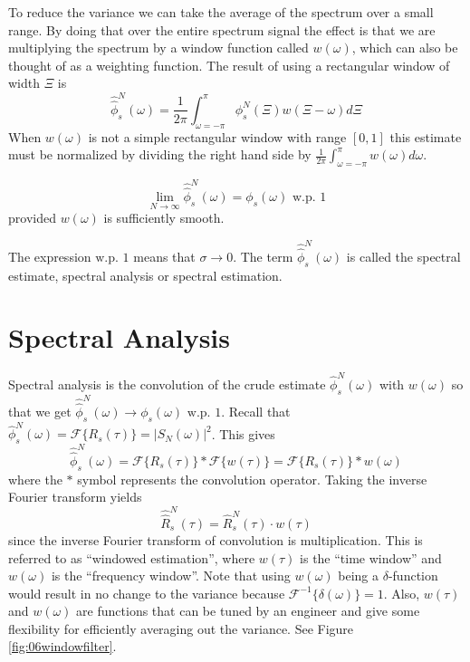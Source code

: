 \documentclass[lecture,12pt,]{pcms-l}
\theoremstyle{example}
\newcommand{\w}{\omega}
\begin{document}
To reduce the variance we can take the average of the spectrum over a small range. By doing that over the entire spectrum signal the effect is that we are multiplying the spectrum by a window function called $w(\w)$, which can also be thought of as a weighting function. The result of using a rectangular window of width $\Xi$ is
$$\hat{\hat{\phi}}_s^N(\w) = \frac{1}{2\pi}\int_{\w=-\pi}^\pi \phi_s^N(\Xi)w(\Xi-\w)d\Xi$$
When $w(\w)$ is not a simple rectangular window with range $[0,1]$ this estimate must be normalized by dividing the right hand side by $\frac{1}{2\pi}\int_{\w=-\pi}^\pi w(\w)d\w$.

\begin{theorem}
$$\lim_{N\to\infty}\hat{\hat{\phi}}_s^N(\w) = \phi_s(\w) \text{ w.p. } 1$$
provided $w(\w)$ is sufficiently smooth.
\end{theorem}
The expression $\text{w.p. } 1$ means that $\sigma\to 0$. The term $\hat{\hat{\phi}}_s^N(\w)$ is called the spectral estimate, spectral analysis or spectral estimation.

\section{Spectral Analysis}
Spectral analysis is the convolution of the crude estimate $\hat{\phi}_s^N(\w)$ with $w(\w)$ so that we get $\hat{\hat{\phi}}_s^N(\w) \to \phi_s(\w) \text{ w.p. } 1$. Recall that $\hat{\phi}_s^N(\w) = \mathcal{F}\{R_s(\tau)\} = |S_N(\w)|^2$. This gives
$$\hat{\hat{\phi}}_s^N(\w) = \mathcal{F}\{R_s(\tau)\} * \mathcal{F}\{w(\tau)\} = \mathcal{F}\{R_s(\tau)\} * w(\w)$$
where the $*$ symbol represents the convolution operator. Taking the inverse Fourier transform yields
$$\hat{\hat{R}}_s^N(\tau) = \hat{R}_s^N(\tau)\cdot w(\tau)$$
since the inverse Fourier transform of convolution is multiplication. This is referred to as ``windowed estimation'', where $w(\tau)$ is the ``time window'' and $w(\w)$ is the ``frequency window''. Note that using $w(\w)$ being a $\delta$-function would result in no change to the variance because $\mathcal{F}^{-1}\{\delta(\w)\} = 1$. Also, $w(\tau)$ and $w(\w)$ are functions that can be tuned by an engineer and give some flexibility for efficiently averaging out the variance. See Figure \ref{fig:06windowfilter}.
\end{document}
